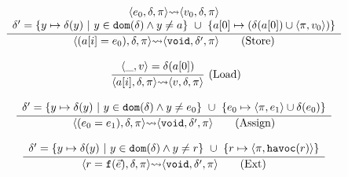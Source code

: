 \documentclass[conference, romanappendices]{tex/IEEEtran}
\theoremstyle{bfnote}
\newcommand{\valEnv}{\delta}
\newcommand{\pathEnv}{\pi}
\newcommand{\irulelabel}[3]
{
\mkern-2mu
\begin{array}{ll}
\displaystyle\frac{#1}{\vphantom{,}#2} & \!\!\!\!#3
\end{array}
\mkern-2mu
}
\begin{document}
\begin{figure}[t]
\[\begin{array}{c}
\irulelabel
{\begin{array}{c}
{\langle e_0, \valEnv,\pathEnv \rangle {\leadsto} \langle v_0, \valEnv, \pathEnv \rangle} \\
    \valEnv' = \{ y \mapsto \valEnv(y) \ | \ y \in \mathtt{dom}(\valEnv) \land y \neq a\} \ \cup \ \{a[0] \mapsto (\valEnv(a[0]) \cup \langle \pathEnv, v_0 \rangle) \} \\
\end{array}}
{\langle (a[i] = e_0), \valEnv,\pathEnv \rangle {\leadsto} \langle \mathtt{void}, \valEnv', \pathEnv \rangle \hspace{20pt minus 1fill}\textrm{(Store)}}{} \\ \ \\

\irulelabel
{\begin{array}{c}
    \langle \_, v \rangle = \valEnv(a[0])\\
\end{array}}
{\langle a[i], \valEnv,\pathEnv \rangle {\leadsto} \langle v, \valEnv, \pathEnv \rangle}
{\textrm{(Load)}} \\ \ \\

\irulelabel
{\begin{array}{c}
    \valEnv' = \{ y \mapsto \valEnv(y) \ | \ y \in \mathtt{dom}(\valEnv) \land y \neq e_0\} \ \cup \ \{e_0 \mapsto \langle \pathEnv,e_1 \rangle \cup \valEnv(e_0)\} \\
\end{array}}
{\langle (e_0=e_1), \valEnv,\pathEnv \rangle {\leadsto} \langle \mathtt{void}, \valEnv', \pathEnv \rangle \hspace{20pt minus 1fill}\textrm{(Assign)}}
{} \\ \ \\


\irulelabel
{\begin{array}{c}
    \valEnv' = \{ y \mapsto \valEnv(y) \ | \ y \in \mathtt{dom}(\valEnv) \land y \neq r\} \ \cup \ \{r \mapsto \langle \pathEnv,\mathtt{havoc}(r) \rangle \} \\
\end{array}}
{\langle r=\mathtt{f}(\vec{e}), \valEnv,\pathEnv \rangle {\leadsto} \langle \mathtt{void}, \valEnv', \pathEnv \rangle \hspace{20pt minus 1fill}\textrm{(Ext)}}
{} \\ \ \\


\end{array}\]
\end{figure}
\end{document}
